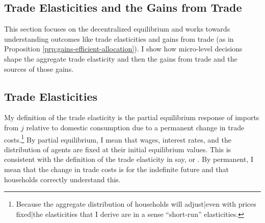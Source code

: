 \documentclass[12pt,pdftex]{article}
\begin{document}
\begin{onehalfspacing}
\section{Trade Elasticities and the Gains from Trade}

This section focuses on the decentralized equilibrium and works towards understanding outcomes like trade elasticities and gains from trade (as in Proposition \ref{prp:gains-efficient-allocation}). I show how micro-level decisions shape the aggregate trade elasticity and then the gains from trade and the sources of those gains.

\subsection{Trade Elasticities}\label{sec:trade-elasticity}

My definition of the trade elasticity is the partial equilibrium response of imports from $j$ relative to domestic consumption due to a permanent change in trade costs.\footnote{Because the aggregate distribution of households will adjust|even with prices fixed|the elasticities that I derive are in a sense ``short-run'' elasticities.} By partial equilibrium, I mean that wages, interest rates, and the distribution of agents are fixed at their initial equilibrium values. This is consistent with the definition of the trade elasticity in say, \citet{arkolakis2012new} or \citet{simonovska2014elasticity}. By permanent, I mean that the change in trade costs is for the indefinite future and that households correctly understand this.


\end{onehalfspacing}
\end{document}
